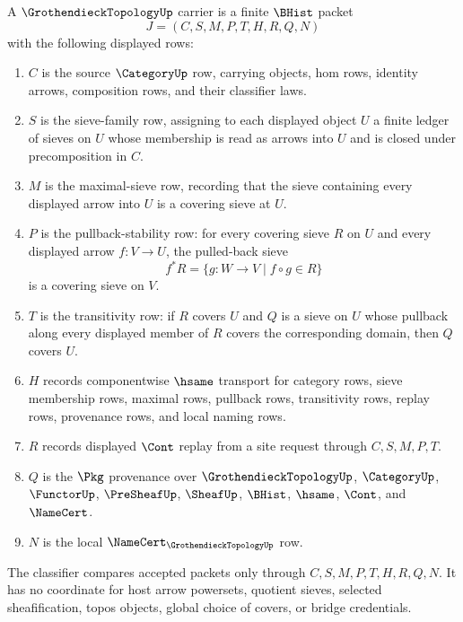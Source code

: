 \begin{definition}
\label{def:grothendieck-topology-carrier}
A $\GrothendieckTopologyUp$ carrier is a finite $\BHist$ packet
$$
J=(C,S,M,P,T,H,R,Q,N)
$$
with the following displayed rows:
\begin{enumerate}
\item $C$ is the source $\CategoryUp$ row, carrying objects, hom rows, identity arrows, composition rows, and their classifier laws.
\item $S$ is the sieve-family row, assigning to each displayed object $U$ a finite ledger of sieves on $U$ whose membership is read as arrows into $U$ and is closed under precomposition in $C$.
\item $M$ is the maximal-sieve row, recording that the sieve containing every displayed arrow into $U$ is a covering sieve at $U$.
\item $P$ is the pullback-stability row: for every covering sieve $R$ on $U$ and every displayed arrow $f:V\to U$, the pulled-back sieve
$$
f^{\ast}R=\{g:W\to V \mid f\circ g\in R\}
$$
is a covering sieve on $V$.
\item $T$ is the transitivity row: if $R$ covers $U$ and $Q$ is a sieve on $U$ whose pullback along every displayed member of $R$ covers the corresponding domain, then $Q$ covers $U$.
\item $H$ records componentwise $\hsame$ transport for category rows, sieve membership rows, maximal rows, pullback rows, transitivity rows, replay rows, provenance rows, and local naming rows.
\item $R$ records displayed $\Cont$ replay from a site request through $C,S,M,P,T$.
\item $Q$ is the $\Pkg$ provenance over $\GrothendieckTopologyUp$, $\CategoryUp$, $\FunctorUp$, $\PreSheafUp$, $\SheafUp$, $\BHist$, $\hsame$, $\Cont$, and $\NameCert$.
\item $N$ is the local $\NameCert_{\GrothendieckTopologyUp}$ row.
\end{enumerate}
The classifier compares accepted packets only through $C,S,M,P,T,H,R,Q,N$. It has no coordinate for host arrow powersets, quotient sieves, selected sheafification, topos objects, global choice of covers, or bridge credentials.
\end{definition}

